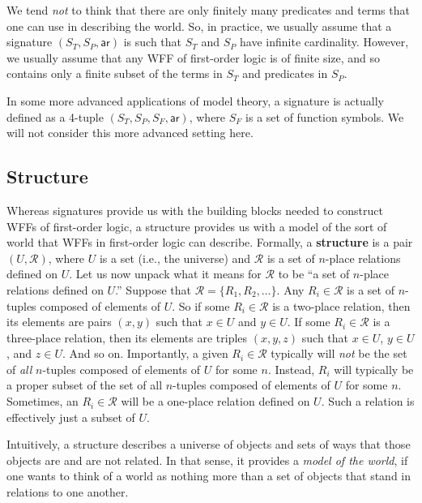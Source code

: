 \documentclass[11pt]{article}
\theoremstyle{definition}
\theoremstyle{remark}
\begin{document}
We tend \textit{not} to think that there are only finitely many predicates and terms that one can use in describing the world. So, in practice, we usually assume that a signature $(S_{T},S_{P},\textsf{ar})$ is such that $S_{T}$ and $S_{P}$ have infinite cardinality. However, we usually assume that any WFF of first-order logic is of finite size, and so contains only a finite subset of the terms in $S_{T}$ and predicates in $S_{P}$.\par 

In some more advanced applications of model theory, a signature is actually defined as a 4-tuple $(S_{T},S_{P},S_{F},\textsf{ar})$, where $S_{F}$ is a set of function symbols. We will not consider this more advanced setting here.


\subsection{Structure}
Whereas signatures provide us with the building blocks needed to construct WFFs of first-order logic, a structure provides us with a model of the sort of world that WFFs in first-order logic can describe. Formally, a \textbf{structure} is a pair $(U,\mathcal{R})$, where $U$ is a set (i.e., the universe) and $\mathcal{R}$ is a set of $n$-place relations defined on $U$. Let us now unpack what it means for $\mathcal{R}$ to be ``a set of $n$-place relations defined on $U$.'' Suppose that $\mathcal{R}=\{R_{1},R_{2},\dots\}$. Any $R_{i}\in\mathcal{R}$ is a set of $n$-tuples composed of elements of $U$. So if some $R_{i}\in\mathcal{R}$ is a two-place relation, then its elements are pairs $(x,y)$ such that $x\in U$ and $y\in U$. If some $R_{i}\in\mathcal{R}$ is a three-place relation, then its elements are triples $(x,y,z)$ such that $x\in U$, $y\in U$, and $z\in U$. And so on. Importantly, a given $R_{i}\in\mathcal{R}$ typically will \textit{not} be the set of \textit{all} $n$-tuples composed of elements of $U$ for some $n$. Instead, $R_{i}$ will typically be a proper subset of the set of all $n$-tuples composed of elements of $U$ for some $n$. Sometimes, an $R_{i}\in\mathcal{R}$ will be a one-place relation defined on $U$. Such a relation is effectively just a subset of $U$.\par 

Intuitively, a structure describes a universe of objects and sets of ways that those objects are and are not related. In that sense, it provides a \textit{model of the world}, if one wants to think of a world as nothing more than a set of objects that stand in relations to one another.\par 
\end{document}
